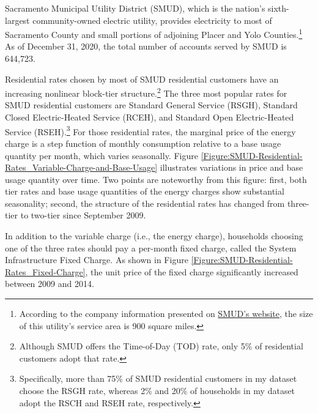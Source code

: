 Sacramento Municipal Utility District (SMUD), which is the nation's sixth-largest community-owned electric utility, provides electricity to most of Sacramento County and small portions of adjoining Placer and Yolo Counties.\footnote{According to the company information presented on \href{https://www.smud.org/en/Corporate/About-us/Company-Information}{SMUD's website}, the size of this utility's service area is 900 square miles.} As of December 31, 2020, the total number of accounts served by SMUD is 644,723.

Residential rates chosen by most of SMUD residential customers have an increasing nonlinear block-tier structure.\footnote{Although SMUD offers the Time-of-Day (TOD) rate, only 5\% of residential customers adopt that rate.} The three most popular rates for SMUD residential customers are Standard General Service (RSGH), Standard Closed Electric-Heated Service (RCEH), and Standard Open Electric-Heated Service (RSEH).\footnote{Specifically, more than 75\% of SMUD residential customers in my dataset choose the RSGH rate, whereas 2\% and 20\% of households in my dataset adopt the RSCH and RSEH rate, respectively.} For those residential rates, the marginal price of the energy charge is a step function of monthly consumption relative to a base usage quantity per month, which varies seasonally. Figure \ref{Figure:SMUD-Residential-Rates_Variable-Charge-and-Base-Usage} illustrates variations in price and base usage quantity over time. Two points are noteworthy from this figure: first, both tier rates and base usage quantities of the energy charges show substantial seasonality; second, the structure of the residential rates has changed from three-tier to two-tier since September 2009.

In addition to the variable charge (i.e., the energy charge), households choosing one of the three rates should pay a per-month fixed charge, called the System Infrastructure Fixed Charge. As shown in Figure \ref{Figure:SMUD-Residential-Rates_Fixed-Charge}, the unit price of the fixed charge significantly increased between 2009 and 2014. 

